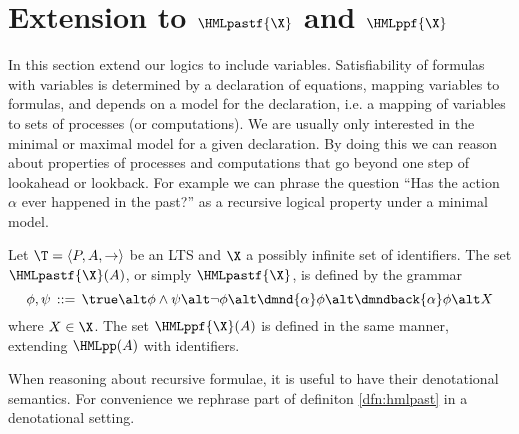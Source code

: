 \section{Extension to $\HMLpastf{\X}$ and $\HMLppf{\X}$}

In this section extend our logics to include variables. Satisfiability of 
formulas with variables is determined by a declaration of equations,
mapping variables to formulas, and depends on a model for the declaration,
i.e. a mapping of variables to sets of processes (or computations). We
are usually only interested in the minimal or maximal model for a given
declaration. By doing this we can reason about properties of processes
and computations that go beyond one step of lookahead or lookback. For
example we can phrase the question ``Has the action $\alpha$ ever happened
in the past?'' as a recursive logical property under a minimal model.

\begin{definition}
    Let $\T=\langle P,A,\rightarrow \rangle$ be an LTS and $\X$ a possibly
    infinite
    set of identifiers. The set $\HMLpastf{\X}(A)$,
    or simply $\HMLpastf{\X}$, is defined by the grammar
    \[
        \phi,\psi \,::=\, \true \alt \phi\land\psi
                                \alt \neg\phi
                                \alt \dmnd{\alpha} \phi
                                \alt \dmndback{\alpha} \phi
                                \alt X
    \]
    where $X\in \X$. The set $\HMLppf{\X}(A)$ is defined in the same manner, 
    extending $\HMLpp(A)$ with identifiers.
\end{definition}

When reasoning about recursive formulae, it is useful to have their denotational
semantics. For convenience we rephrase part of definiton \ref{dfn:hmlpast} in a 
denotational setting.

